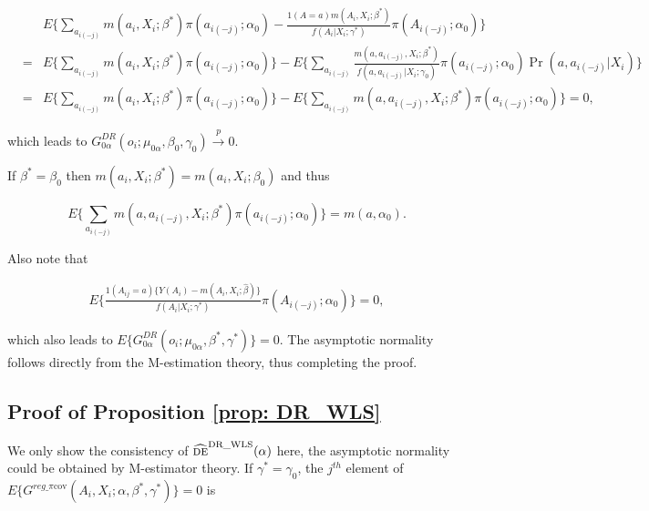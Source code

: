 \documentclass[oupdraft]{biostatistics}
\begin{document}
\vspace{-1cm}
\begin{eqnarray*}
&&  E\Biggl\{\sum_{a_{i(-j)}}m(a_i,X_i;\beta^{*})\pi(a_{i(-j)};\alpha_0)
  -
  \frac{1(A=a)m(A_i,X_i;\beta^{*})}{f(A_i|X_i;\gamma^{*})}\pi(A_{i(-j)};\alpha_0)\Biggr\}\\
&=&  E\Biggl\{\sum_{a_{i(-j)}}m(a_i,X_i;\beta^{\ast})\pi(a_{i(-j)};\alpha_0)\Biggr\}
  - E\Biggl\{\sum_{a_{i(-j)}}\frac{m(a,a_{i(-j)},X_i;\beta^{\ast})}{{f}(a,a_{i(-j)}|X_i;\gamma_0)}
  \pi(a_{i(-j)};\alpha_0)\Pr(a,a_{i(-j)}|X_i)\Biggr\}\\
&=&  E\Biggl\{\sum_{a_{i(-j)}}m(a_i,X_i;\beta^{\ast})\pi(a_{i(-j)};\alpha_0)\Biggr\}
  - E\Biggl\{\sum_{a_{i(-j)}}m(a,a_{i(-j)},X_i;\beta^{\ast})
  \pi(a_{i(-j)};\alpha_0)\Biggr\}
=0,
  \end{eqnarray*}

\noindent which leads to $G^{DR}_{0\alpha}(o_i;\mu_{0\alpha},\beta_0,\gamma_0)\xrightarrow{p}0$.

If $\beta^{*}=\beta_0$ then $m(a_i,X_i;\beta^{*})=m(a_i,X_i;\beta_0)$  and thus

\vspace{-.4cm}
\begin{equation*}
 E\Biggl\{\sum_{a_{i(-j)}}m(a,a_{i(-j)},X_i;\beta^{*})\pi(a_{i(-j)};\alpha_0)\Biggr\}=m(a,\alpha_0).
\end{equation*}

\vspace{-.4cm}
\noindent Also note that

\vspace{-1cm}
\begin{eqnarray*}
  E\Biggl\{\frac{1(A_{ij}=a)\{Y(A_i)-m(A_i,X_i;\hat\beta)\}}{{f}(A_i|X_i;\gamma^{*})}\pi(A_{i(-j)};\alpha_0)\Biggr\}
=0,
\end{eqnarray*}


\noindent which also leads to $E\{G^{DR}_{0\alpha}(o_i;\mu_{0\alpha},\beta^{*},\gamma^{*})\}=0$. The asymptotic normality follows directly from the M-estimation theory, thus completing the proof.

\subsection*{Proof of Proposition \ref{prop: DR_WLS}}

We only show the consistency of $\widehat{\textsc{de}}^{\text{DR\_WLS}}(\alpha)$ here, the asymptotic normality could be obtained by M-estimator theory. If $\gamma^{*}=\gamma_0$, the $j^{th}$ element of $E\{G^{reg\_\pi\text{cov}}(A_i,X_i;\alpha,\beta^{*},\gamma^{*})\}=0$ is
\end{document}
